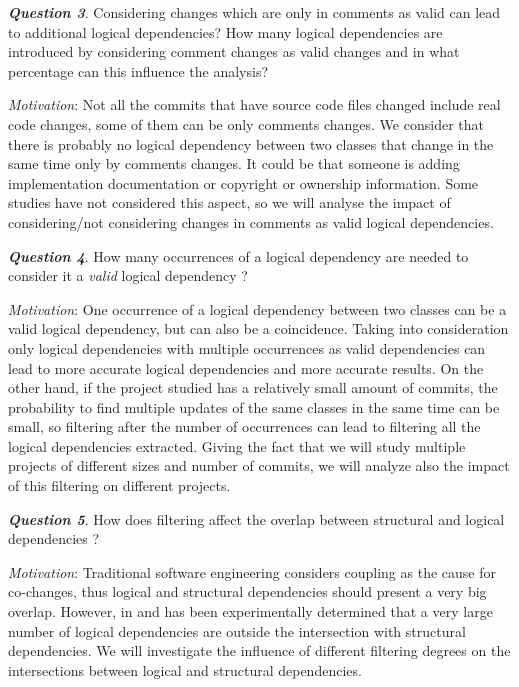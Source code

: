 \documentclass[a4paper,twoside]{article}
\begin{document}
\textit{\textbf{Question 3}}. Considering changes which are only in comments as valid can lead to additional logical dependencies? How many logical dependencies are introduced by considering comment changes as valid changes and in what percentage can this influence the analysis?

\textit{Motivation}: Not all the commits that have source code files changed include real code changes, some of them can be only comments changes. We consider that there is probably no logical dependency between two classes that change in the same time only by comments changes. It could be that someone is adding implementation documentation or copyright or ownership information. Some studies have not considered this aspect, so we will analyse the impact of considering/not considering changes in  comments as valid logical dependencies. 


\textit{\textbf{Question 4}}. How many occurrences of a logical dependency are needed to consider it a \textit{valid} logical dependency ? 

\textit{Motivation}: One occurrence of a logical dependency between two classes can be a valid logical dependency, but can also be a coincidence. Taking into consideration only logical dependencies with multiple occurrences as valid dependencies can lead to more accurate logical dependencies and more accurate results. On the other hand, if the project studied has a relatively small amount of commits, the probability to find multiple updates of the same classes in the same time can be small, so filtering after the number of occurrences can lead to filtering all the logical dependencies extracted. Giving the fact that we will study multiple projects of different sizes and number of commits, we will analyze also the impact of this filtering on different projects.

\textit{\textbf{Question 5}}. How does filtering affect the overlap between structural and logical dependencies ? 

\textit{Motivation}: Traditional software engineering considers coupling as the cause for co-changes, thus logical and structural dependencies should present a very big overlap. However, in \cite{Oliva:2011:ISL:2067853.2068086} and \cite{DBLP:journals/jss/AjienkaC17} has been experimentally determined that a very large number of logical dependencies are outside the intersection with structural dependencies. We will investigate the influence of different filtering degrees on the intersections between logical and structural dependencies.  
\end{document}
